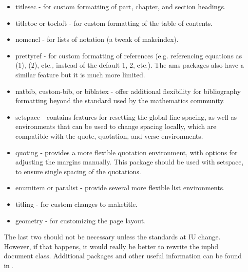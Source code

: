 \documentclass{iuphd}
\begin{document}
\begin{itemize}
 \item titlesec - for custom formatting of part, chapter, and section headings.
 \item titletoc or tocloft - for custom formatting of the table of contents.
 \item nomencl - for lists of notation (a tweak of makeindex).
 \item prettyref - for custom formatting of references (e.g. referencing equations as (1), (2), etc., instead of the default
       1, 2, etc.).  The ams packages also have a similar feature but it is much more limited.
 \item natbib, custom-bib, or biblatex - offer additional flexibility for bibliography formatting beyond the standard used by
       the mathematics community.
 \item setspace - contains features for resetting the global line spacing, as well as environments that can be used to change
       spacing locally, which are compatible with the quote, quotation, and verse environments.
 \item quoting - provides a more flexible quotation environment, with options for adjusting the margins manually.  This package
     should be used with setspace, to ensure single spacing of the quotations.
 \item enumitem or paralist - provide several more flexible list environments.
 \item titling - for custom changes to maketitle.
 \item geometry - for customizing the page layout.
\end{itemize}


The last two should not be necessary unless the standards at IU change.  However, if that happens, it would really be better to
rewrite the iuphd document class.  Additional packages and other useful information can be found in \cite{mittelbach2004latex}.
\end{document}
